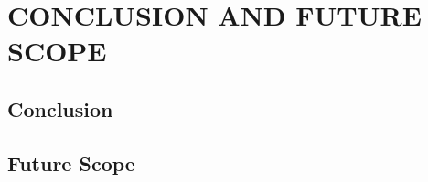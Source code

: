 \chapter{CONCLUSION AND FUTURE SCOPE}
\label{chap:conclusions}

\section{Conclusion}


\section{Future Scope}
